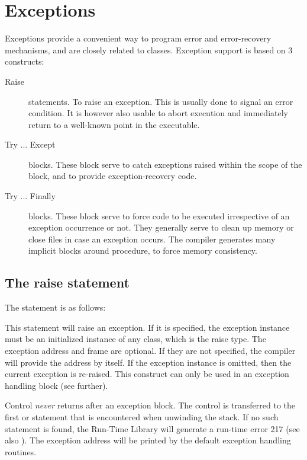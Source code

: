 \chapter{Exceptions}
\label{ch:Exceptions}
Exceptions provide a convenient way to program error and error-recovery
mechanisms, and are closely related to classes.
Exception support is based on 3 constructs:
\begin{description}
\item [Raise\ ] statements. To raise an exception. This is usually done to signal an
error condition. It is however also usable to
abort execution and immediately return to a well-known point in the
executable.
\item [Try ... Except\ ] blocks. These block serve to catch exceptions
raised within the scope of the block, and to provide exception-recovery
code.
\item [Try ... Finally\ ] blocks. These block serve to force code to be
executed irrespective of an exception occurrence or not. They generally
serve to clean up memory or close files in case an exception occurs.
The compiler generates many implicit  blocks around
procedure, to force memory consistency.
\end{description}


\section{The raise statement}
The  statement is as follows:

This statement will raise an exception. If it is specified, the exception
instance must be an initialized instance of any class, which is the raise
type. The exception address and frame are optional. If they are not specified, 
the compiler will provide the address by itself. If the exception instance is omitted, 
then the current exception is re-raised. This construct can only be used 
in an exception handling block (see further).

\begin{remark} Control {\em never} returns after an exception block. The
control is transferred to the first  or
 statement that is encountered when unwinding the stack.
If no such statement is found, the \fpc Run-Time Library will generate a
run-time error 217 (see also ). The exception address
will be printed by the default exception handling routines.
\end{remark}

